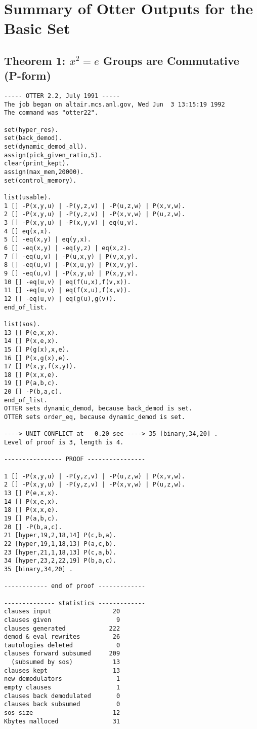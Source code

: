 \section{Summary of Otter Outputs for the Basic Set}

\subsection{Theorem 1: $x^2=e$ Groups are Commutative (P-form)}
{\small \begin{verbatim}
----- OTTER 2.2, July 1991 -----
The job began on altair.mcs.anl.gov, Wed Jun  3 13:15:19 1992
The command was "otter22".

set(hyper_res).
set(back_demod).
set(dynamic_demod_all).
assign(pick_given_ratio,5).
clear(print_kept).
assign(max_mem,20000).
set(control_memory).

list(usable).
1 [] -P(x,y,u) | -P(y,z,v) | -P(u,z,w) | P(x,v,w).
2 [] -P(x,y,u) | -P(y,z,v) | -P(x,v,w) | P(u,z,w).
3 [] -P(x,y,u) | -P(x,y,v) | eq(u,v).
4 [] eq(x,x).
5 [] -eq(x,y) | eq(y,x).
6 [] -eq(x,y) | -eq(y,z) | eq(x,z).
7 [] -eq(u,v) | -P(u,x,y) | P(v,x,y).
8 [] -eq(u,v) | -P(x,u,y) | P(x,v,y).
9 [] -eq(u,v) | -P(x,y,u) | P(x,y,v).
10 [] -eq(u,v) | eq(f(u,x),f(v,x)).
11 [] -eq(u,v) | eq(f(x,u),f(x,v)).
12 [] -eq(u,v) | eq(g(u),g(v)).
end_of_list.

list(sos).
13 [] P(e,x,x).
14 [] P(x,e,x).
15 [] P(g(x),x,e).
16 [] P(x,g(x),e).
17 [] P(x,y,f(x,y)).
18 [] P(x,x,e).
19 [] P(a,b,c).
20 [] -P(b,a,c).
end_of_list.
OTTER sets dynamic_demod, because back_demod is set.
OTTER sets order_eq, because dynamic_demod is set.

----> UNIT CONFLICT at   0.20 sec ----> 35 [binary,34,20] .
Level of proof is 3, length is 4.

---------------- PROOF ----------------

1 [] -P(x,y,u) | -P(y,z,v) | -P(u,z,w) | P(x,v,w).
2 [] -P(x,y,u) | -P(y,z,v) | -P(x,v,w) | P(u,z,w).
13 [] P(e,x,x).
14 [] P(x,e,x).
18 [] P(x,x,e).
19 [] P(a,b,c).
20 [] -P(b,a,c).
21 [hyper,19,2,18,14] P(c,b,a).
22 [hyper,19,1,18,13] P(a,c,b).
23 [hyper,21,1,18,13] P(c,a,b).
34 [hyper,23,2,22,19] P(b,a,c).
35 [binary,34,20] .

------------ end of proof -------------

-------------- statistics -------------
clauses input                 20
clauses given                  9
clauses generated            222
demod & eval rewrites         26
tautologies deleted            0
clauses forward subsumed     209
  (subsumed by sos)           13
clauses kept                  13
new demodulators               1
empty clauses                  1
clauses back demodulated       0
clauses back subsumed          0
sos size                      12
Kbytes malloced               31


\end{verbatim}}
